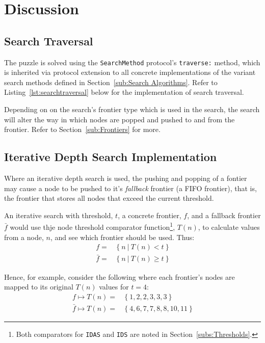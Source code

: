 \section{Discussion}
\label{sec:Discussion}

\subsection{Search Traversal}
\label{sub:Search Traversal}

The puzzle is solved using the \texttt{SearchMethod} protocol's
\texttt{traverse:} method, which is inherited via protocol extension to all
concrete implementations of the variant search methods defined in
Section~\ref{sub:Search Algorithms}. Refer to Listing~\ref{lst:searchtraversal}
below for the implementation of search traversal.

Depending on on the search's frontier type which is used in the search, the
search will alter the way in which nodes are popped and pushed to and from the
frontier. Refer to Section~\ref{sub:Frontiers} for more.



\subsection{Iterative Depth Search Implementation}
\label{sub:Iterative Depth Search Implementation}

Where an iterative depth search is used, the pushing and popping of a fontier
may cause a node to be pushed to it's \emph{fallback} frontier (a FIFO frontier),
that is, the frontier that stores all nodes that exceed the current threshold.

An iterative search with threshold, $t$, a concrete frontier, $f$, and a
fallback frontier $\bar{f}$ would use thje node threshold comparator
function\footnote{Both comparators for \texttt{IDAS} and \texttt{IDS} are noted
in Section~\ref{subs:Thresholds}.}, $T(n)$, to calculate values from a node,
$n$, and see which frontier should be used. Thus:
\begin{align}\label{eq:frontiercalc}
        f =& \ \{ \ n \ | \ T(n) < t    \ \}     \\
  \bar{f} =& \ \{ \ n \ | \ T(n) \geq t \ \}
\end{align}

Hence, for example, consider the following where each frontier's nodes are
mapped to its original $T(n)$ values for $t=4$:
\begin{align*}
      f  \mapsto T(n) =& \ \{ \ 1 , 2 , 2 , 3 , 3 , 3 \ \}\\
 \bar{f} \mapsto T(n) =& \ \{ \ 4 , 6 , 7 , 7 , 8 , 8 , 10, 11 \ \}
\end{align*}

